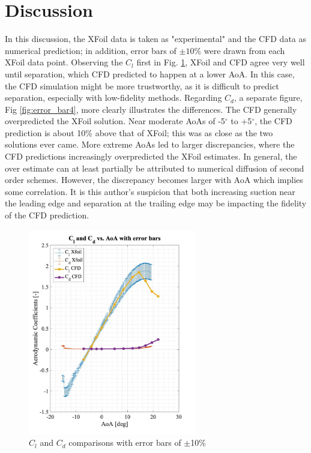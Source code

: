 \section{Discussion}

In this discussion, the XFoil data is taken as "experimental" and the CFD data as numerical prediction; in addition, error bars of $\pm10\%$ were drawn from each XFoil data point. Observing the $C_l$ first in Fig. \ref{fig:error_bar1}, XFoil and CFD agree very well until separation, which CFD predicted to happen at a lower AoA. In this case, the CFD simulation might be more trustworthy, as it is difficult to predict separation, especially with low-fidelity methods. Regarding $C_d$, a separate figure, Fig \ref{fig:error_bar4}, more clearly illustrates the differences. The CFD generally overpredicted the XFoil solution. Near moderate AoAs of -5$^\circ$ to +5$^\circ$, the CFD prediction is about 10\% above that of XFoil; this was as close as the two solutions ever came. More extreme AoAs led to larger discrepancies, where the CFD predictions increasingly overpredicted the XFoil estimates. In general, the over estimate can at least partially be attributed to numerical diffusion of second order schemes. However, the discrepancy becomes larger with AoA which implies some correlation. It is this author's suspicion that both increasing suction near the leading edge and separation at the trailing edge may be impacting the fidelity of the CFD prediction.

\begin{figure}[H]
\centering
    \includegraphics[width=0.65\textwidth]{error_bar1.jpg}
    \caption{$C_l$ and $C_d$ comparisons with error bars of $\pm$10\%}
    \label{fig:error_bar1}
\end{figure}

